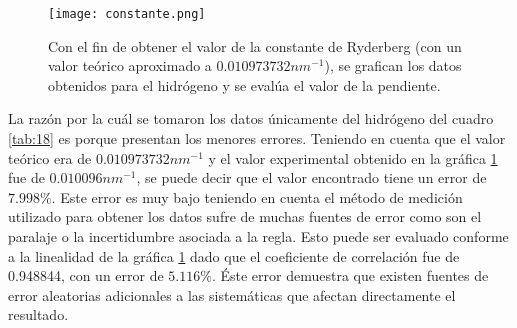 \documentclass[%
 reprint,
 amsmath,amssymb,
 aps,
]{revtex4-1}
\begin{document}
\begin{figure}[H]
    \centering
    \texttt{[image: constante.png]}
    \caption{Con el fin de obtener el valor de la constante de Ryderberg (con un valor teórico aproximado a $0.010973732 nm^{-1}$), se grafican los datos obtenidos para el hidrógeno y se evalúa el valor de la pendiente.}
    \label{fig:constante}
\end{figure}

La razón por la cuál se tomaron los datos únicamente del hidrógeno del cuadro \ref{tab:18} es porque presentan los menores errores. Teniendo en cuenta que el valor teórico era de $0.010973732 nm^{-1}$ y el valor experimental obtenido en la gráfica \ref{fig:constante} fue de $0.010096 nm^{-1}$, se puede decir que el valor encontrado tiene un error de $7.998\%$. Este error es muy bajo teniendo en cuenta el método de medición utilizado para obtener los datos sufre de muchas fuentes de error como son el paralaje o la incertidumbre asociada a la regla. Esto puede ser evaluado conforme a la linealidad de la gráfica \ref{fig:constante} dado que el coeficiente de correlación fue de 0.948844, con un error de $5.116\%$. Éste error demuestra que existen fuentes de error aleatorias adicionales a las sistemáticas que afectan directamente el resultado.
\end{document}
